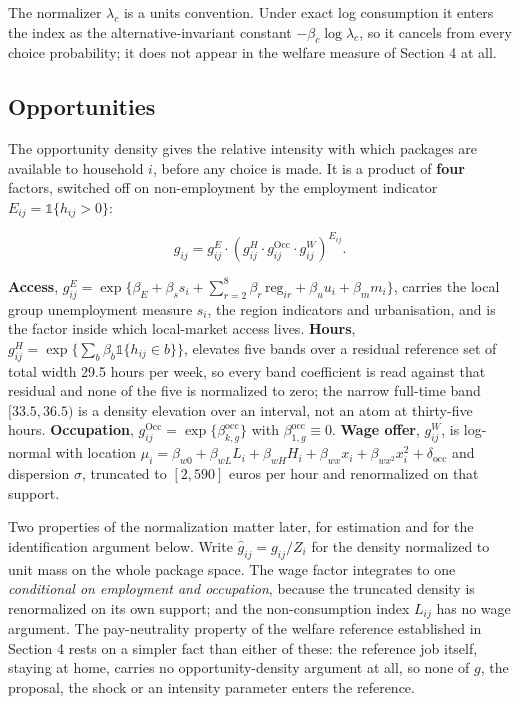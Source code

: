 \documentclass[11pt,a4paper]{article}
\begin{document}
The normalizer \(\lambda_c\) is a units convention. Under exact log consumption it enters the index as the alternative-invariant constant \(-\beta_c\log\lambda_c\), so it cancels from every choice probability; it does not appear in the welfare measure of Section 4 at all.

\subsection{Opportunities}\label{opportunities}

The opportunity density gives the relative intensity with which packages are available to household \(i\), before any choice is made. It is a product of \textbf{four} factors, switched off on non-employment by the employment indicator \(E_{ij}=\mathbb 1\{h_{ij}>0\}\):

\[
g_{ij}=g^{E}_{ij}\cdot\left(g^{H}_{ij}\cdot g^{\mathrm{Occ}}_{ij}\cdot g^{W}_{ij}\right)^{E_{ij}} .
\]

\textbf{Access}, \(g^{E}_{ij}=\exp\{\beta_E+\beta_s s_i+\sum_{r=2}^{8}\beta_r\,\mathrm{reg}_{ir}+\beta_u u_i+\beta_m m_i\}\), carries the local group unemployment measure \(s_i\), the region indicators and urbanisation, and is the factor inside which local-market access lives. \textbf{Hours}, \(g^{H}_{ij}=\exp\{\sum_b \beta_b\mathbb 1\{h_{ij}\in b\}\}\), elevates five bands over a residual reference set of total width 29.5 hours per week, so every band coefficient is read against that residual and none of the five is normalized to zero; the narrow full-time band \([33.5,36.5)\) is a density elevation over an interval, not an atom at thirty-five hours. \textbf{Occupation}, \(g^{\mathrm{Occ}}_{ij}=\exp\{\beta^{\mathrm{occ}}_{k,g}\}\) with \(\beta^{\mathrm{occ}}_{1,g}\equiv 0\). \textbf{Wage offer}, \(g^{W}_{ij}\), is log-normal with location \(\mu_i=\beta_{w0}+\beta_{wL}L_i+\beta_{wH}H_i+\beta_{wx}x_i+\beta_{wx^{2}}x_i^{2}+\delta_{\mathrm{occ}}\) and dispersion \(\sigma\), truncated to \([2,590]\) euros per hour and renormalized on that support.

Two properties of the normalization matter later, for estimation and for the identification argument below. Write \(\widehat g_{ij}=g_{ij}/Z_i\) for the density normalized to unit mass on the whole package space. The wage factor integrates to one \emph{conditional on employment and occupation}, because the truncated density is renormalized on its own support; and the non-consumption index \(L_{ij}\) has no wage argument. The pay-neutrality property of the welfare reference established in Section 4 rests on a simpler fact than either of these: the reference job itself, staying at home, carries no opportunity-density argument at all, so none of \(g\), the proposal, the shock or an intensity parameter enters the reference.
\end{document}
